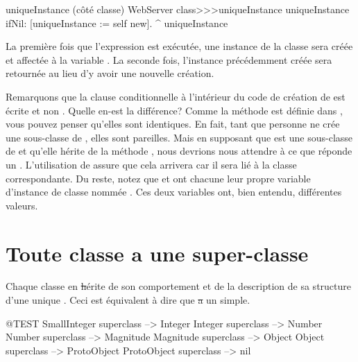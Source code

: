 \documentclass[a4paper,10pt,twoside]{book}
\begin{document}
\begin{method}[uniqueInstance]{uniqueInstance (c\^ot\'e classe)}
WebServer class>>>uniqueInstance
     uniqueInstance ifNil: [uniqueInstance := self new].
     ^ uniqueInstance
\end{method}

La premi\`ere fois que l'expression  est ex\'ecut\'ee, une instance de la classe  sera cr\'e\'ee et affect\'ee \`a la variable . 
La seconde fois, l'instance pr\'ec\'edemment cr\'e\'ee sera retourn\'ee au lieu d'y avoir une nouvelle cr\'eation. 

Remarquons que la clause conditionnelle \`a l'int\'erieur du code de cr\'eation
de  est \'ecrite  et non 
\mbox{.}
Quelle en-est la diff\'erence?   Comme la m\'ethode  est d\'efinie dans , vous pouvez penser qu'elles sont identiques.    En fait, tant que personne ne cr\'ee une sous-classe de , elles sont pareilles. Mais en supposant que  est une sous-classe de  et qu'elle h\'erite de la m\'ethode ,
nous devrions nous attendre \`a ce que  r\'eponde un . L'utilisation de \self assure que cela arrivera car il sera li\'e \`a la classe correspondante.
Du reste, notez que  et  ont chacune
leur propre variable d'instance de classe nomm\'ee .  Ces
deux variables ont, bien entendu, diff\'erentes valeurs.

\section{Toute classe a une super-classe}


Chaque classe en \st h\'erite de son comportement et de la description
de sa structure d'une unique .
Ceci est \'equivalent \`a dire que \st a un  simple.

\begin{code}{@TEST}
SmallInteger superclass --> Integer
Integer superclass          --> Number
Number superclass        --> Magnitude
Magnitude superclass    --> Object
Object superclass           --> ProtoObject
ProtoObject superclass  --> nil
\end{code}
\end{document}
